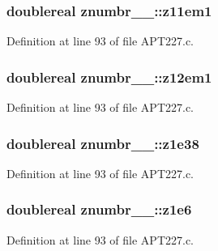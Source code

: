 \subsubsection[{\texorpdfstring{z11em1}{z11em1}}]{\setlength{\rightskip}{0pt plus 5cm}doublereal znumbr\+\_\+\_\+\+::z11em1}\hypertarget{structznumbr__1___aedfe3b1a975295602fdab4b9a11e6bd1}{}\label{structznumbr__1___aedfe3b1a975295602fdab4b9a11e6bd1}


Definition at line 93 of file A\+P\+T227.\+c.

\subsubsection[{\texorpdfstring{z12em1}{z12em1}}]{\setlength{\rightskip}{0pt plus 5cm}doublereal znumbr\+\_\+\_\+\+::z12em1}\hypertarget{structznumbr__1___ab175693663fe459a2d9794a40e1474d1}{}\label{structznumbr__1___ab175693663fe459a2d9794a40e1474d1}


Definition at line 93 of file A\+P\+T227.\+c.

\subsubsection[{\texorpdfstring{z1e38}{z1e38}}]{\setlength{\rightskip}{0pt plus 5cm}doublereal znumbr\+\_\+\_\+\+::z1e38}\hypertarget{structznumbr__1___ab937e4448021b398707fbb2974195793}{}\label{structznumbr__1___ab937e4448021b398707fbb2974195793}


Definition at line 93 of file A\+P\+T227.\+c.

\subsubsection[{\texorpdfstring{z1e6}{z1e6}}]{\setlength{\rightskip}{0pt plus 5cm}doublereal znumbr\+\_\+\_\+\+::z1e6}\hypertarget{structznumbr__1___a9146191471810501becf0917b6780ba4}{}\label{structznumbr__1___a9146191471810501becf0917b6780ba4}


Definition at line 93 of file A\+P\+T227.\+c.

